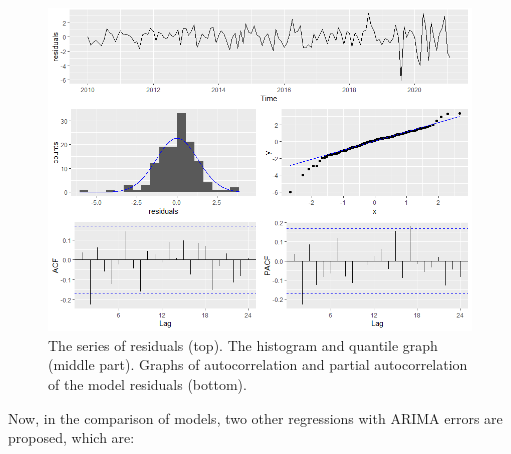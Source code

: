 %
\begin{figure}[ht]
	\centering
	\includegraphics[width = 1\columnwidth]{Figs/d}
	\caption{The series of residuals (top). The histogram and quantile graph (middle part). Graphs of autocorrelation and partial autocorrelation of the model residuals (bottom).}
	\label{fig:residuos2}
\end{figure}
%
Now, in the comparison of models, two other regressions with ARIMA errors are proposed, which are:

